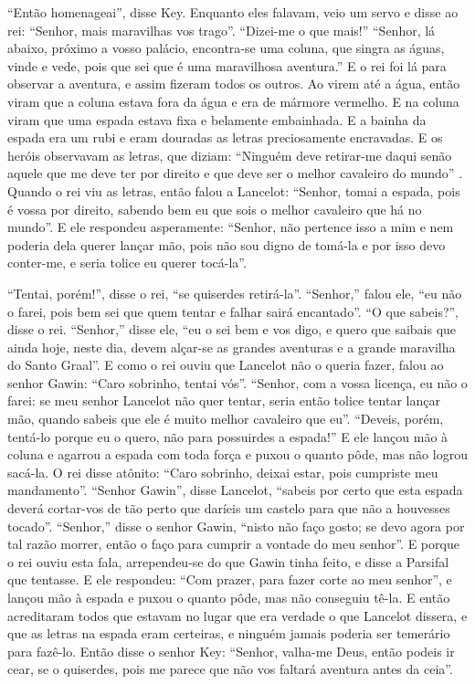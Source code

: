 “Então homenageai”, disse Key. Enquanto eles falavam, veio um servo e disse ao
rei: “Senhor, mais maravilhas vos trago”. “Dizei-me o que mais!” “Senhor, lá
abaixo, próximo a vosso palácio, encontra-se uma coluna, que singra as águas,
vinde e vede, pois que sei que é uma maravilhosa aventura.” E o rei foi lá para
observar a aventura, e assim fizeram todos os outros. Ao virem até a água,
então viram que a coluna estava fora da água e era de mármore vermelho. E na
coluna viram que uma espada estava fixa e belamente embainhada. E a bainha da
espada era um rubi e eram douradas as letras preciosamente encravadas. E os
heróis observavam as letras, que diziam: “Ninguém deve retirar-me daqui senão
aquele que me deve ter por direito e que deve ser o melhor cavaleiro do mundo”
. Quando o rei viu as letras, então falou a Lancelot: “Senhor, tomai a
espada, pois é vossa por direito, sabendo bem eu que sois o melhor cavaleiro
que há no mundo”. E ele respondeu asperamente: “Senhor, não pertence isso a mim
e nem poderia dela querer lançar mão, pois não sou digno de tomá-la e por isso
devo conter-me, e seria tolice eu querer tocá-la”. 

“Tentai, porém!”, disse o rei, “se quiserdes retirá-la”. “Senhor,” falou ele,
“eu não o farei, pois bem sei que quem tentar e falhar sairá encantado”. “O que
sabeis?”, disse o rei. “Senhor,” disse ele, “eu o sei bem e vos digo, e quero
que saibais que ainda hoje, neste dia, devem alçar-se as grandes aventuras e a
grande maravilha do Santo Graal”. E como o rei ouviu que Lancelot não
o queria fazer, falou ao senhor Gawin: “Caro sobrinho, tentai vós”. “Senhor,
com a vossa licença, eu não o farei: se meu senhor Lancelot não quer tentar,
seria então tolice tentar lançar mão, quando sabeis que ele é muito melhor
cavaleiro que eu”. “Deveis, porém, tentá-lo porque eu o quero, não para
possuirdes a espada!” E ele lançou mão à coluna e agarrou a espada com toda
força e puxou o quanto pôde, mas não logrou sacá-la. O rei disse atônito: “Caro
sobrinho, deixai estar, pois cumpriste meu mandamento”. “Senhor Gawin”, disse
Lancelot, “sabeis por certo que esta espada deverá cortar-vos de tão perto que
daríeis um castelo para que não a houvesses tocado”. “Senhor,” disse o senhor
Gawin, “nisto não faço gosto; se devo agora por tal razão morrer, então o faço
para cumprir a vontade do meu senhor”. E porque o rei ouviu esta fala,
arrependeu-se do que Gawin tinha feito, e disse a Parsifal que tentasse. E ele
respondeu: “Com prazer, para fazer corte ao meu senhor”, e lançou mão à espada
e puxou o quanto pôde, mas não conseguiu tê-la. E então acreditaram
todos que estavam no lugar que era verdade o que Lancelot dissera, e que as
letras na espada eram certeiras, e ninguém jamais poderia ser temerário para
fazê-lo. Então disse o senhor Key: “Senhor, valha-me Deus, então podeis ir
cear, se o quiserdes, pois me parece que não vos faltará aventura antes da
ceia”. 

